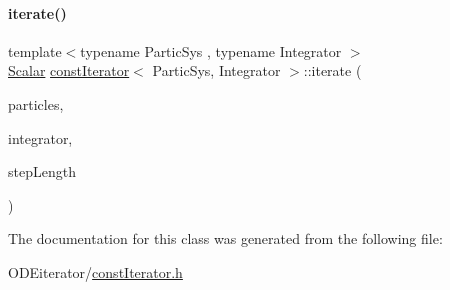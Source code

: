 \paragraph{\texorpdfstring{iterate()}{iterate()}}
{\footnotesize\ttfamily template$<$typename Partic\+Sys , typename Integrator $>$ \\
\mbox{\hyperlink{classconst_iterator_a7cdf84749facbb55a6a2674646f92f52}{Scalar}} \mbox{\hyperlink{classconst_iterator}{const\+Iterator}}$<$ Partic\+Sys, Integrator $>$\+::iterate (\begin{DoxyParamCaption}\item[{Partic\+Sys \&}]{particles,  }\item[{Integrator \&}]{integrator,  }\item[{\mbox{\hyperlink{classconst_iterator_a7cdf84749facbb55a6a2674646f92f52}{Scalar}}}]{step\+Length }\end{DoxyParamCaption})\hspace{0.3cm}{\ttfamily [inline]}}



The documentation for this class was generated from the following file\+:\begin{DoxyCompactItemize}
\item 
O\+D\+Eiterator/\mbox{\hyperlink{const_iterator_8h}{const\+Iterator.\+h}}\end{DoxyCompactItemize}
